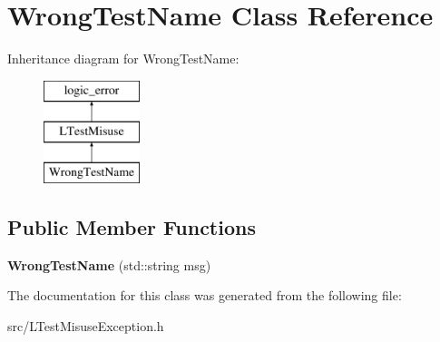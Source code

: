 \hypertarget{class_wrong_test_name}{\section{Wrong\-Test\-Name Class Reference}
\label{class_wrong_test_name}
}
Inheritance diagram for Wrong\-Test\-Name\-:\begin{figure}[H]
\begin{center}
\leavevmode
\includegraphics[height=3.000000cm]{class_wrong_test_name}
\end{center}
\end{figure}
\subsection*{Public Member Functions}
\begin{DoxyCompactItemize}
\item 
\hypertarget{class_wrong_test_name_ab37497609264df3a66c0de7c5e979fe4}{{\bfseries Wrong\-Test\-Name} (std\-::string msg)}\label{class_wrong_test_name_ab37497609264df3a66c0de7c5e979fe4}

\end{DoxyCompactItemize}


The documentation for this class was generated from the following file\-:\begin{DoxyCompactItemize}
\item 
src/L\-Test\-Misuse\-Exception.\-h\end{DoxyCompactItemize}
